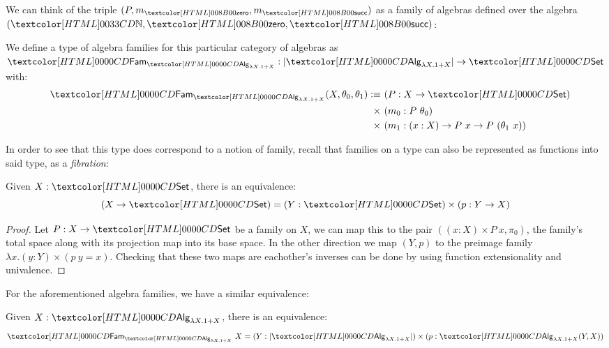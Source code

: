 We can think of the triple $(P,m_{\natzero},m_{\natsucc})$ as a family
of algebras defined over the algebra $(\natty, \natzero, \natsucc)$:

\begin{definition}
  We define a type of algebra families for this particular category of
  algebras as
  $\Fam_{\Alg_{\lambda X . 1 + X}} : | \Alg_{\lambda X . 1 + X} | \to
  \Set$ with:
  \begin{align*}
    &&\Fam_{\Alg_{\lambda X . 1 + X}} (X , \theta_0, \theta_1) \ddefeq&\ (P : X \to \Set) \\
    &&\times&\ (m_0 : P\ \theta_0) \\
    &&\times&\ (m_1 : (x : X) \to P\ x \to P\ (\theta_1\ x))
  \end{align*}
\end{definition}

In order to see that this type does correspond to a notion of family,
recall that families on a type can also be represented as functions
into said type, \ie as a \emph{fibration}:

\begin{proposition}
Given $X : \Set$, there is an equivalence:
$$
(X \to \Set) = (Y : \Set) \times (p : Y \to X)
$$
\end{proposition}

\begin{proof}
  Let $P : X \to \Set$ be a family on $X$, we can map this to the
  pair $((x : X) \times P\ x, \pi_0)$, \ie the family's total space
  along with its projection map into its base space. In the other
  direction we map $(Y,p)$ to the preimage family
  $\lambda x . (y : Y) \times (p\ y = x)$. Checking that these two
  maps are eachother's inverses can be done by using function
  extensionality and univalence.
\end{proof}

For the aforementioned algebra families, we have a similar
equivalence:

\begin{proposition}
Given $X : \Alg_{\lambda X . 1 + X}$, there is an equivalence:
$$
\Fam_{\Alg_{\lambda X . 1 + X}}\ X = (Y : | \Alg_{\lambda X . 1 +
  X} |) \times (p : \Alg_{\lambda X . 1 + X}(Y,X))
$$
\end{proposition}


